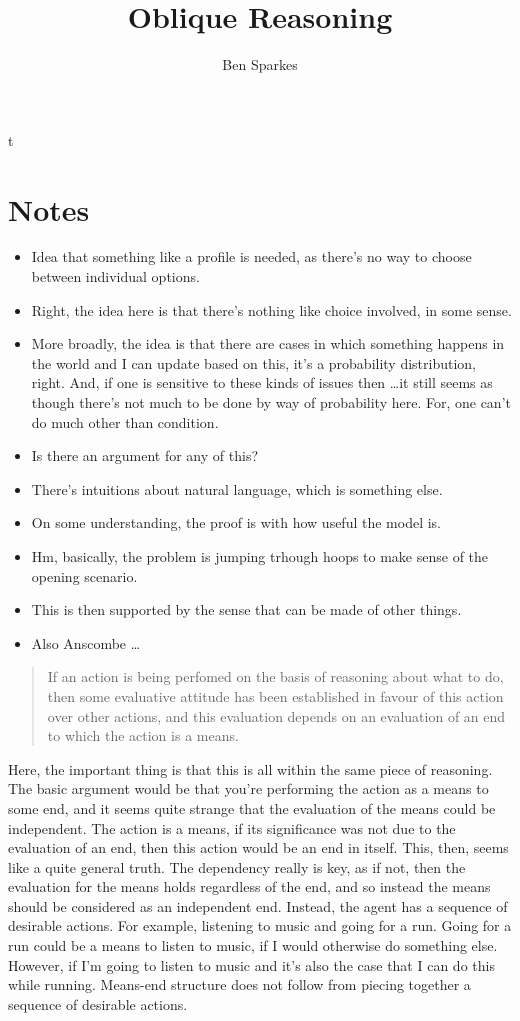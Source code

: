 \documentclass[10pt]{article}
\title{Oblique Reasoning}
\author{Ben Sparkes}
\begin{document}

t

\section*{Notes}

\begin{itemize}
\item Idea that something like a profile is needed, as there's no way to choose between individual options.
\item Right, the idea here is that there's nothing like choice involved, in some sense.
\item More broadly, the idea is that there are cases in which something happens in the world and I can update based on this, it's a probability distribution, right.
  And, if one is sensitive to these kinds of issues then \dots it still seems as though there's not much to be done by way of probability here.
  For, one can't do much other than condition.
\end{itemize}


\begin{itemize}
\item Is there an argument for any of this?
\item There's intuitions about natural language, which is something else.
\item On some understanding, the proof is with how useful the model is.
\item Hm, basically, the problem is jumping trhough hoops to make sense of the opening scenario.
\item This is then supported by the sense that can be made of other things.
\item Also Anscombe \dots
\end{itemize}

\newpage

\begin{quote}
  If an action is being perfomed on the basis of reasoning about what to do, then some evaluative attitude has been established in favour of this action over other actions, and this evaluation depends on an evaluation of an end to which the action is a means.
\end{quote}
Here, the important thing is that this is all within the same piece of reasoning.
The basic argument would be that you're performing the action as a means to some end, and it seems quite strange that the evaluation of the means could be independent.
The action is a means, if its significance was not due to the evaluation of an end, then this action would be an end in itself.
This, then, seems like a quite general truth.
The dependency really is key, as if not, then the evaluation for the means holds regardless of the end, and so instead the means should be considered as an independent end.
Instead, the agent has a sequence of desirable actions.
For example, listening to music and going for a run.
Going for a run could be a means to listen to music, if I would otherwise do something else.
However, if I'm going to listen to music and it's also the case that I can do this while running.
Means-end structure does not follow from piecing together a sequence of desirable actions.
\end{document}
